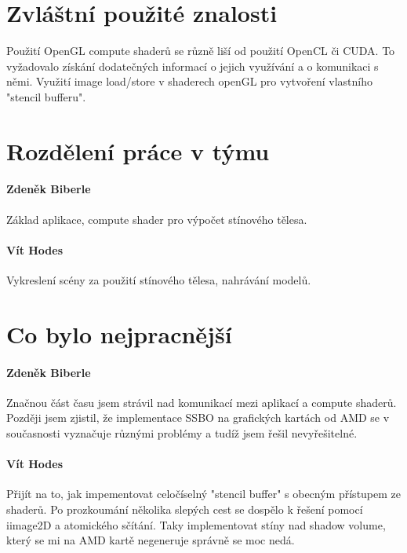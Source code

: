 \documentclass[11pt,a4paper]{article}
\begin{document}
\section{Zvláštní použité znalosti}

Použití OpenGL compute shaderů se různě liší od použití OpenCL či CUDA. To vyžadovalo získání dodatečných informací o jejich využívání a o komunikaci s němi.
Využití image load/store v shaderech openGL pro vytvoření vlastního "stencil bufferu".

\section{Rozdělení práce v týmu}

\paragraph{Zdeněk Biberle} Základ aplikace, compute shader pro výpočet stínového tělesa.
\paragraph{Vít Hodes} Vykreslení scény za použití stínového tělesa, nahrávání modelů.

\section{Co bylo nejpracnější}

\paragraph{Zdeněk Biberle}

Značnou část času jsem strávil nad komunikací mezi aplikací a compute shaderů. Později jsem zjistil, že implementace SSBO na grafických kartách od AMD se v současnosti vyznačuje různými problémy a tudíž jsem řešil nevyřešitelné.

\paragraph{Vít Hodes} Přijít na to, jak impementovat celočíselný "stencil buffer" s obecným přístupem ze shaderů. Po prozkoumání několika slepých cest se dospělo k řešení pomocí iimage2D a atomického sčítání. Taky implementovat stíny nad shadow volume, který se mi na AMD kartě negeneruje správně se moc nedá.
\end{document}
